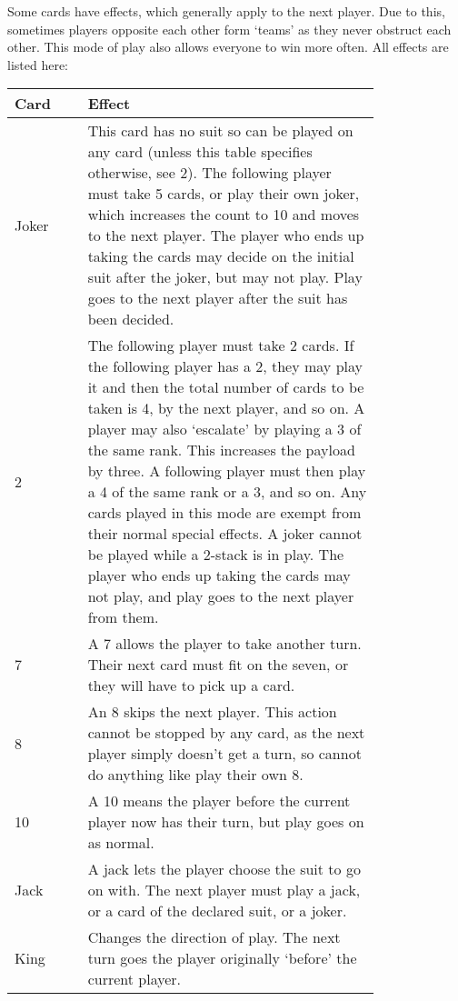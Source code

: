 \documentclass[fleqn,a4paper,11pt]{article}
\begin{document}
    Some cards have effects, which generally apply to the next player. Due to
    this, sometimes players opposite each other form `teams' as they never
    obstruct each other. This mode of play also allows everyone to win more
    often. All effects are listed here:

    \begin{center}
    {
    \renewcommand{\arraystretch}{2.0}
    \begin{tabular}{lp{0.8\linewidth}} \toprule
    Card & Effect \\ \midrule
    Joker &
    This card has no suit so can be played on any card (unless this table
    specifies otherwise, see 2). The following player must take 5 cards, or
    play their own joker, which increases the count to 10 and moves to the next
    player. The player who ends up taking the cards may decide on the initial
    suit after the joker, but may not play. Play goes to the next player after
    the suit has been decided. \label{card:joker}
    \\ 2 &
    The following player must take 2 cards. If the following player has a 2,
    they may play it and then the total number of cards to be taken is 4, by
    the next player, and so on. A player may also `escalate' by playing a 3 of
    the same rank. This increases the payload by three. A following player must
    then play a 4 of the same rank or a 3, and so on. Any cards played in this
    mode are exempt from their normal special effects. A joker cannot be played
    while a 2-stack is in play. The player who ends up taking the cards may not
    play, and play goes to the next player from them.
    \\ 7 &
    A 7 allows the player to take another turn. Their next card must fit on
    the seven, or they will have to pick up a card.
    \\ 8 &
    An 8 skips the next player. This action cannot be stopped by any card,
    as the next player simply doesn't get a turn, so cannot do anything like
    play their own 8.
    \\ 10 &
    A 10 means the player before the current player now has their turn, but
    play goes on as normal.
    \\ Jack &
    A jack lets the player choose the suit to go on with. The next player must
    play a jack, or a card of the declared suit, or a joker.
    \\ King &
    Changes the direction of play. The next turn goes the player originally
    `before' the current player.
    \\ \bottomrule
    \end{tabular}
    }
    \end{center}
\end{document}
